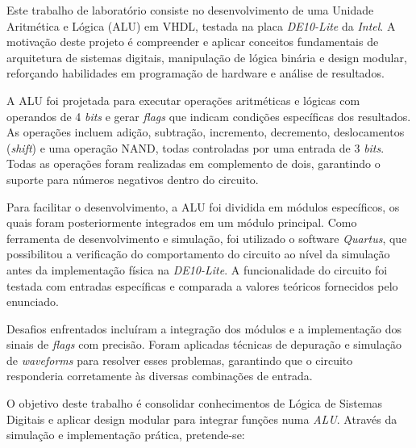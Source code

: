 \pagestyle{geral}
\justifying


Este trabalho de laboratório consiste no desenvolvimento de uma Unidade Aritmética e Lógica (ALU) em VHDL, testada na placa \textit{DE10-Lite} da \textit{Intel}. A motivação deste projeto é compreender e aplicar conceitos fundamentais de arquitetura de sistemas digitais, manipulação de lógica binária e design modular, reforçando habilidades em programação de hardware e análise de resultados.
\vspace{5mm}

A ALU foi projetada para executar operações aritméticas e lógicas com operandos de 4 \textit{bits} e gerar \textit{flags} que indicam condições específicas dos resultados. As operações incluem adição, subtração, incremento, decremento, deslocamentos (\textit{shift}) e uma operação NAND, todas controladas por uma entrada de 3 \textit{bits}. Todas as operações foram realizadas em complemento de dois, garantindo o suporte para números negativos dentro do circuito.
\vspace{5mm}

Para facilitar o desenvolvimento, a ALU foi dividida em módulos específicos, os quais foram posteriormente integrados em um módulo principal. Como ferramenta de desenvolvimento e simulação, foi utilizado o software \textit{Quartus}, que possibilitou a verificação do comportamento do circuito ao nível da simulação antes da implementação física na \textit{DE10-Lite}. A funcionalidade do circuito foi testada com entradas específicas e comparada a valores teóricos fornecidos pelo enunciado.
\vspace{5mm}

Desafios enfrentados incluíram a integração dos módulos e a implementação dos sinais de \textit{flags} com precisão. Foram aplicadas técnicas de depuração e simulação de \textit{waveforms} para resolver esses problemas, garantindo que o circuito responderia corretamente às diversas combinações de entrada.
\newpage


O objetivo deste trabalho é consolidar conhecimentos de Lógica de Sistemas Digitais e aplicar design modular para integrar funções numa \textit{ALU}. Através da simulação e implementação prática, pretende-se:


